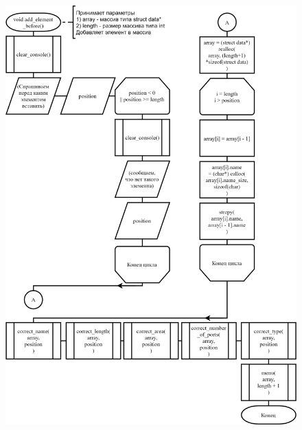 \begin{figure}[!htp]
    \includegraphics{../src/submenu/add_element_before/add_element_before.png}
\end{figure}
